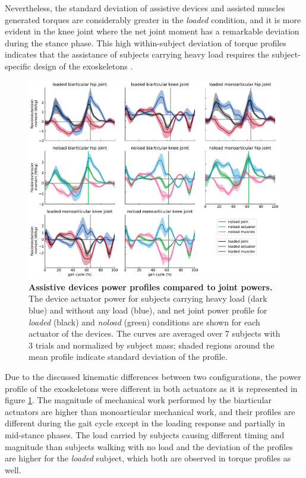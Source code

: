 \documentclass[10pt,letterpaper]{article}
\begin{document}
Nevertheless, the standard deviation of assistive devices and assisted muscles generated torques are considerably greater in the \textit{loaded} condition, and it is more evident in the knee joint where the net joint moment has a remarkable deviation during the stance phase. This high within-subject deviation of torque profiles indicates that the assistance of subjects carrying heavy load requires the subject-specific design of the exoskeletons \cite{2}.\\
\begin{figure}[ht]   
	\centering
	\includegraphics[width=\linewidth]{Ideal_Exo_MonovsBi_Figures/PaperFigure_Exoskeletons_Power.pdf}
	\vspace{1mm}
	\caption{{\small\textbf{Assistive devices power profiles compared to joint powers.} The device actuator power for subjects carrying heavy load (dark blue) and without any load (blue), and net joint power profile for \textit{loaded} (black) and \textit{noload} (green) conditions are shown for each actuator of the devices. The curves are averaged over 7 subjects with 3 trials and normalized by subject mass; shaded regions around the mean profile indicate standard deviation of the profile.}}
	\label{Fig_IdealExo_Power}
\end{figure}
Due to the discussed kinematic differences between two configurations, the power profile of the exoskeletons were different in both actuators as it is represented in figure \ref{Fig_IdealExo_Power}. The magnitude of mechanical work performed by the biarticular actuators are higher than monoarticular mechanical work, and their profiles are different during the gait cycle except in the loading response and partially in mid-stance phases. The load carried by subjects causing different timing and magnitude than subjects walking with no load and the deviation of the profiles are higher for the \textit{loaded} subject, which both are observed in torque profiles as well.\\
\end{document}
